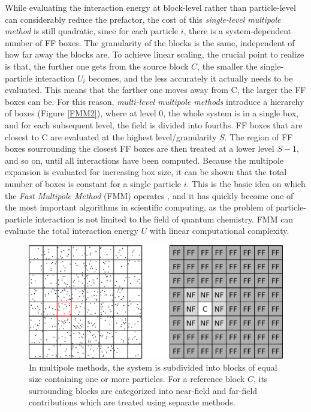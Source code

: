 \noindent While evaluating the interaction energy at block-level rather than particle-level can considerably reduce the prefactor, the cost of this \emph{single-level multipole method} is still quadratic, since for each particle $i$, there is a system-dependent number of FF boxes. The granularity of the blocks is the same, independent of how far away the blocks are. To achieve linear scaling, the crucial point to realize is that, the further one gets from the source block $C$, the smaller the single-particle interaction $U_i$ becomes, and the less accurately it actually needs to be evaluated. This means that the farther one moves away from C, the larger the FF boxes can be. For this reason, \emph{multi-level multipole methods} introduce a hierarchy of boxes (Figure \ref{FMM2}), where at level 0, the whole system is in a single box, and for each subsequent level, the field is divided into fourths. FF boxes that are closest to C are evaluated at the highest level/granularity $S$. The region of FF boxes sourrounding the closest FF boxes are then treated at a lower level $S-1$, and so on, until all interactions have been computed. Because the multipole expansion is evaluated for increasing box size, it can be shown that the total number of boxes is constant for a single particle $i$. This is the basic idea on which the \emph{Fast Multipole Method} (FMM) operates \cite{Gre1987,Gre1994,Din1992}, and it has quickly become one of the most important algorithms in scientific computing, as the problem of particle-particle interaction is not limited to the field of quantum chemistry. FMM can evaluate the total interaction energy $U$ with linear computational complexity.

\begin{figure}
\centering
\includegraphics[scale=0.35]{Pics/FMM1}
\caption{In multipole methods, the system is subdivided into blocks of equal size containing one or more particles. For a reference block $C$, its surrounding blocks are categorized into near-field and far-field contributions which are treated using separate methods.}
\label{fig:FMM1}
\end{figure}

